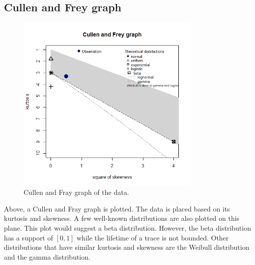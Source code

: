 \subsection{Cullen and Frey graph}
\begin{figure}[H]
\centering
\includegraphics[width=0.8\textwidth]{Plots/CullenAndFray.png}
\caption{Cullen and Fray graph of the data.}
\end{figure}
Above, a Cullen and Fray graph is plotted. The data is placed based on its kurtosis and skewness. A few well-known distributions are also plotted on this plane. This plot would suggest a beta distribution. However, the beta distribution has a support of $[0,1]$ while the lifetime of a trace is not bounded. Other distributions that have similar kurtosis and skewness are the Weibull distribution and the gamma distribution.




